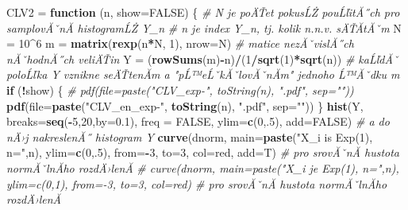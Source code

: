 \documentclass[
]{article}
\newenvironment{Shaded}{\begin{snugshade}}{\end{snugshade}}
\newcommand{\AttributeTok}[1]{\textcolor[rgb]{0.13,0.29,0.53}{#1}}
\newcommand{\CommentTok}[1]{\textcolor[rgb]{0.56,0.35,0.01}{\textit{#1}}}
\newcommand{\ConstantTok}[1]{\textcolor[rgb]{0.56,0.35,0.01}{#1}}
\newcommand{\ControlFlowTok}[1]{\textcolor[rgb]{0.13,0.29,0.53}{\textbf{#1}}}
\newcommand{\DecValTok}[1]{\textcolor[rgb]{0.00,0.00,0.81}{#1}}
\newcommand{\FloatTok}[1]{\textcolor[rgb]{0.00,0.00,0.81}{#1}}
\newcommand{\FunctionTok}[1]{\textcolor[rgb]{0.13,0.29,0.53}{\textbf{#1}}}
\newcommand{\NormalTok}[1]{#1}
\newcommand{\OtherTok}[1]{\textcolor[rgb]{0.56,0.35,0.01}{#1}}
\newcommand{\SpecialCharTok}[1]{\textcolor[rgb]{0.81,0.36,0.00}{\textbf{#1}}}
\newcommand{\StringTok}[1]{\textcolor[rgb]{0.31,0.60,0.02}{#1}}
\begin{document}
\begin{Shaded}
\begin{Highlighting}[]
\NormalTok{CLV2 }\OtherTok{=} \ControlFlowTok{function}\NormalTok{ (n, }\AttributeTok{show=}\ConstantTok{FALSE}\NormalTok{) \{}
  \CommentTok{\# N je poÄŤet pokusĹŻ pouĹľitĂ˝ch pro samplovĂˇnĂ­ histogramĹŻ Y\_n}
  \CommentTok{\# n je index Y\_n, tj. kolik n.n.v. sÄŤĂ­tĂˇm}
\NormalTok{  N }\OtherTok{=} \DecValTok{10}\SpecialCharTok{\^{}}\DecValTok{6}
\NormalTok{  m }\OtherTok{=} \FunctionTok{matrix}\NormalTok{(}\FunctionTok{rexp}\NormalTok{(n}\SpecialCharTok{*}\NormalTok{N, }\DecValTok{1}\NormalTok{), }\AttributeTok{nrow=}\NormalTok{N)     }\CommentTok{\# matice nezĂˇvislĂ˝ch nĂˇhodnĂ˝ch veliÄŤin}
\NormalTok{  Y }\OtherTok{=}\NormalTok{ (}\FunctionTok{rowSums}\NormalTok{(m)}\SpecialCharTok{{-}}\NormalTok{n)}\SpecialCharTok{/}\NormalTok{(}\DecValTok{1}\SpecialCharTok{/}\FunctionTok{sqrt}\NormalTok{(}\DecValTok{1}\NormalTok{)}\SpecialCharTok{*}\FunctionTok{sqrt}\NormalTok{(n)) }\CommentTok{\# kaĹľdĂˇ poloĹľka Y vznikne seÄŤtenĂ­m a "pĹ™eĹˇkĂˇlovĂˇnĂ­m" jednoho Ĺ™Ăˇdku m}
  \ControlFlowTok{if}\NormalTok{ (}\SpecialCharTok{!}\NormalTok{show)  \{ }
\CommentTok{\#    pdf(file=paste("CLV\_exp{-}", toString(n), ".pdf", sep=""))}
    \FunctionTok{pdf}\NormalTok{(}\AttributeTok{file=}\FunctionTok{paste}\NormalTok{(}\StringTok{"CLV\_en\_exp{-}"}\NormalTok{, }\FunctionTok{toString}\NormalTok{(n), }\StringTok{".pdf"}\NormalTok{, }\AttributeTok{sep=}\StringTok{""}\NormalTok{))    }
\NormalTok{  \}}
  \FunctionTok{hist}\NormalTok{(Y, }\AttributeTok{breaks=}\FunctionTok{seq}\NormalTok{(}\SpecialCharTok{{-}}\DecValTok{5}\NormalTok{,}\DecValTok{20}\NormalTok{,}\AttributeTok{by=}\FloatTok{0.1}\NormalTok{), }\AttributeTok{freq =} \ConstantTok{FALSE}\NormalTok{, }\AttributeTok{ylim=}\FunctionTok{c}\NormalTok{(}\DecValTok{0}\NormalTok{,.}\DecValTok{5}\NormalTok{), }\AttributeTok{add=}\ConstantTok{FALSE}\NormalTok{) }\CommentTok{\# a do nÄ›j nakreslenĂ˝ histogram Y}
  \FunctionTok{curve}\NormalTok{(dnorm, }\AttributeTok{main=}\FunctionTok{paste}\NormalTok{(}\StringTok{"X\_i is Exp(1), n="}\NormalTok{,n), }\AttributeTok{ylim=}\FunctionTok{c}\NormalTok{(}\DecValTok{0}\NormalTok{,.}\DecValTok{5}\NormalTok{), }\AttributeTok{from=}\SpecialCharTok{{-}}\DecValTok{3}\NormalTok{, }\AttributeTok{to=}\DecValTok{3}\NormalTok{, }\AttributeTok{col=}\StringTok{\textquotesingle{}red\textquotesingle{}}\NormalTok{, }\AttributeTok{add=}\NormalTok{T)        }\CommentTok{\# pro srovĂˇnĂ­ hustota normĂˇlnĂ­ho rozdÄ›lenĂ­   }
\CommentTok{\#  curve(dnorm, main=paste("X\_i je Exp(1), n=",n), ylim=c(0,1), from={-}3, to=3, col=\textquotesingle{}red\textquotesingle{})        \# pro srovĂˇnĂ­ hustota normĂˇlnĂ­ho rozdÄ›lenĂ­ }

\end{Highlighting}
\end{Shaded}
\end{document}
